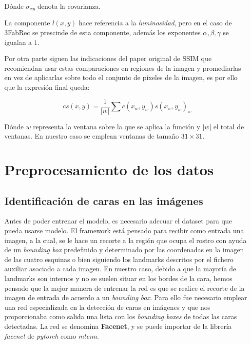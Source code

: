             \noindent Dónde $\sigma_{xy}$ denota la covarianza.

            \medskip

            \noindent La componente $l(x,y)$ hace referencia a la \textit{luminosidad}, pero en el caso de 3FabRec se prescinde de esta componente, además los exponentes $\alpha, \beta , \gamma$ se igualan a $1$.

            \medskip

            \noindent Por otra parte siguen las indicaciones del paper original de SSIM que recomiendan usar estas comparaciones en regiones de la imagen y promediarlas en vez de aplicarlas sobre todo el conjunto de píxeles de la imagen, es por ello que la expresión final queda:

            \begin{equation}
                cs(x,y)=\frac{1}{|w|} \sum{c(x_w,y_w)s(x_w,y_w)}_w
            \end{equation}

            \noindent Dónde $w$ representa la ventana sobre la que se aplica la función y $|w|$ el total de ventanas. En nuestro caso se emplean ventanas de tamaño $31\times 31$.

\section{Preprocesamiento de los datos}
        
        \subsection{Identificación de caras en las imágenes}
            \noindent Antes de poder entrenar el modelo, es necesario adecuar el dataset para que pueda usarse modelo. El framework está pensado para recibir como entrada una imagen, a la cual, se le hace un recorte a la región que ocupa el rostro con ayuda de un \textit{bounding box} predefinido y determinado por las coordenadas en la imagen de las cuatro esquinas o bien siguiendo los landmarks descritos por el fichero auxiliar asociado a cada imagen. En nuestro caso, debido a que la mayoría de landmarks son internos y no se suelen situar en los bordes de la cara, hemos pensado que la mejor manera de entrenar la red es que se realice el recorte de la imagen de entrada de acuerdo a un \textit{bounding box}. Para ello fue necesario emplear una red especializada en la detección de caras en imágenes y que nos proporcionaba como salida una lista con los \textit{bounding boxes} de todas las caras detectadas. La red se denomina \textbf{Facenet}, y se puede importar de la librería \textit{facenet} de \textit{pytorch} como \textit{mtcnn}.

